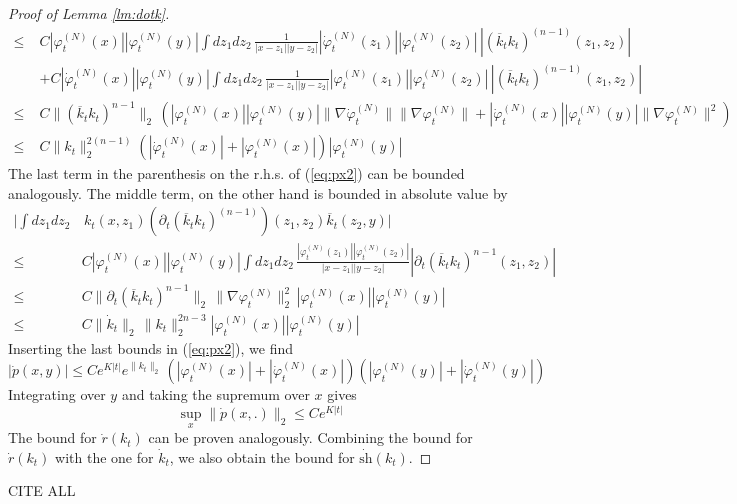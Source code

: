 \documentclass[11pt,a4paper,DIV11]{scrartcl}	%
\newcommand{\ph}{\varphi_t^{(N)}}	%
\newcommand{\phdot}{\dot{\varphi}_t^{(N)}}	%
\begin{document}
\begin{proof}[Proof of Lemma \ref{lm:dotk}]
\[\begin{split}
\leq \; &C |\ph (x)| |\ph (y)| \int dz_1 dz_2 \, \frac{1}{|x-z_1||y-z_2|} |\phdot (z_1)|  |\ph (z_2)| \,  | (\overline{k}_t k_t)^{(n-1)} (z_1 ,z_2)| \\
&+ C |\phdot (x)| |\ph (y)| \int dz_1 dz_2 \, \frac{1}{|x-z_1||y-z_2|} |\ph (z_1)|  |\ph (z_2)| \,  | (\overline{k}_t k_t)^{(n-1)} (z_1 ,z_2)| 
\\ \leq \; & C \| (\overline{k}_t k_t)^{n-1} \|_2  \, \left( |\ph (x)| |\ph (y)| \| \nabla \phdot \| \| \nabla \ph \| +   |\phdot (x)| |\ph (y)| \| \nabla \ph \|^2 \right)
\\ \leq \; & C \| k_t \|_2^{2(n-1)} (|\phdot (x)| + |\ph (x)|) |\ph (y)| 
 \end{split}
\]
The last term in the parenthesis on the r.h.s. of (\ref{eq:px2}) can be bounded analogously. 
The middle term, on the other hand is bounded in absolute value by
\[ \begin{split}
\Big|  \int dz_1 dz_2 & \, k_t (x,z_1) (\partial_t (\overline{k}_t k_t)^{(n-1)}) (z_1 ,z_2) \overline{k}_t (z_2 ,y ) \Big|
 \\ \leq \; & C |\ph (x)| |\ph(y)| \int dz_1 dz_2 \, \frac{ |\ph (z_1)| |\ph (z_2)|}{|x-z_1| |y-z_2|} |\partial_t (\overline{k}_t k_t)^{n-1} (z_1, z_2)|  \\
\leq \; &C \| \partial_t (\overline{k}_t k_t)^{n-1} \|_2 \, \| \nabla \ph \|_2^2 \,   |\ph (x)| |\ph(y)| 
\\
\leq \; &C \| \dot{k}_t \|_2 \, \| k_t \|_2^{2n-3} |\ph (x)| |\ph (y)| 
\end{split}\] 
Inserting the last bounds in (\ref{eq:px2}), we find
\[ |\dot{p} (x,y)| \leq C e^{K |t|}  e^{\| k_t \|_2} \, (|\ph (x)| + |\phdot (x)|) (|\ph (y)| +|\phdot (y)|)  \]
Integrating over $y$ and taking the supremum over $x$ gives
\[ \sup_x \| \dot{p} (x,.) \|_2 \leq C e^{K |t|} \]
The bound for $\dot{r} (k_t)$ can be proven analogously. Combining the bound for $\dot{r} (k_t)$ with the one for $\dot{k}_t$, we also obtain the bound for $\dot{\text{sh}} (k_t)$.
\end{proof}

\cite{*} CITE ALL


\end{document}

